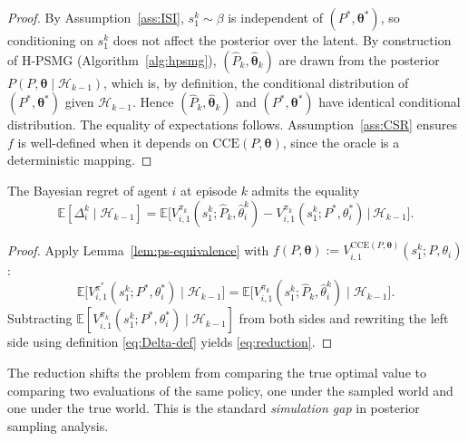 \begin{proof}
By Assumption~\ref{ass:ISI}, $s_1^k \sim \beta$ is independent of $(P^*, \boldsymbol{\theta}^*)$, so conditioning on $s_1^k$ does not affect the posterior over the latent. By construction of H-PSMG (Algorithm~\ref{alg:hpsmg}), $(\hat{P}_k, \hat{\boldsymbol{\theta}}_k)$ are drawn from the posterior $P(P, \boldsymbol{\theta} \mid \mathcal{H}_{k-1})$, which is, by definition, the conditional distribution of $(P^*, \boldsymbol{\theta}^*)$ given $\mathcal{H}_{k-1}$. Hence $(\hat{P}_k, \hat{\boldsymbol{\theta}}_k)$ and $(P^*, \boldsymbol{\theta}^*)$ have identical conditional distribution. The equality of expectations follows. Assumption~\ref{ass:CSR} ensures $f$ is well-defined when it depends on $\mathrm{CCE}(P, \boldsymbol{\theta})$, since the oracle is a deterministic mapping.
\end{proof}

\begin{lemma}
\label{lem:reduction}
The Bayesian regret of agent $i$ at episode $k$ admits the equality
\begin{equation}
\label{eq:reduction}
\mathbb{E}[\Delta_i^k \mid \mathcal{H}_{k-1}] = \mathbb{E}\big[V_{i,1}^{\pi_k}(s_1^k; \hat{P}_k, \hat{\theta}_i^k) - V_{i,1}^{\pi_k}(s_1^k; P^*, \theta_i^*) \,\big|\, \mathcal{H}_{k-1}\big].
\end{equation}
\end{lemma}

\begin{proof}
Apply Lemma~\ref{lem:ps-equivalence} with $f(P, \boldsymbol{\theta}) := V_{i,1}^{\mathrm{CCE}(P, \boldsymbol{\theta})}(s_1^k; P, \theta_i)$:
\begin{equation}
\mathbb{E}\big[V_{i,1}^{\pi^*}(s_1^k; P^*, \theta_i^*) \mid \mathcal{H}_{k-1}\big] = \mathbb{E}\big[V_{i,1}^{\pi_k}(s_1^k; \hat{P}_k, \hat{\theta}_i^k) \mid \mathcal{H}_{k-1}\big].
\end{equation}
Subtracting $\mathbb{E}[V_{i,1}^{\pi_k}(s_1^k; P^*, \theta_i^*) \mid \mathcal{H}_{k-1}]$ from both sides and rewriting the left side using definition \eqref{eq:Delta-def} yields \eqref{eq:reduction}.
\end{proof}

The reduction shifts the problem from comparing the true optimal value to comparing two evaluations of the same policy, one under the sampled world and one under the true world. This is the standard \textit{simulation gap} in posterior sampling analysis.

